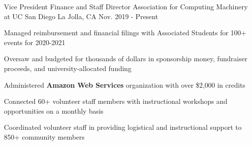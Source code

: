 
\begin{cventries}

  \cventry
    {Vice President Finance and Staff Director} %
    {Association for Computing Machinery at UC San Diego} %
    {La Jolla, CA} %
    {Nov. 2019 - Present} %
    {
      \begin{cvitems} %
        \item {Managed reimbursement and financial filings with Associated Students for 100+ events for 2020-2021}
        \item {Oversaw and budgeted for thousands of dollars in sponsorship money, fundraiser proceeds, and university-allocated funding}
        \item {Administered \textbf{Amazon Web Services} organization with over \$2,000 in credits}
        \item {Connected 60+ volunteer staff members with instructional workshops and opportunities on a monthly basis}
        \item {Coordinated volunteer staff in providing logistical and instructional support to 850+ community members}
      \end{cvitems}
    }



\end{cventries}
